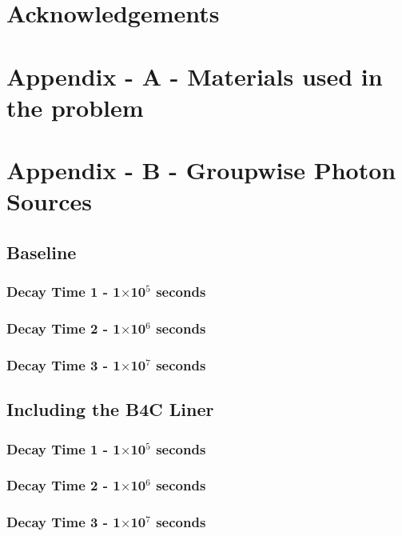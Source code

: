 \documentclass[12pt]{article}
\begin{document}
\section{Acknowledgements}
\newpage
\clearpage


\newpage
\clearpage
\section{Appendix - A - Materials used in the problem}


\section{Appendix - B - Groupwise Photon Sources}
\subsection{Baseline}
\subsubsection{Decay Time 1 - 1$\times$10$^{5}$ seconds}

\subsubsection{Decay Time 2 - 1$\times$10$^{6}$ seconds}

\subsubsection{Decay Time 3 - 1$\times$10$^{7}$ seconds}

\subsection{Including the B4C Liner}
\subsubsection{Decay Time 1 - 1$\times$10$^{5}$ seconds}

\subsubsection{Decay Time 2 - 1$\times$10$^{6}$ seconds}

\subsubsection{Decay Time 3 - 1$\times$10$^{7}$ seconds}

\end{document}
